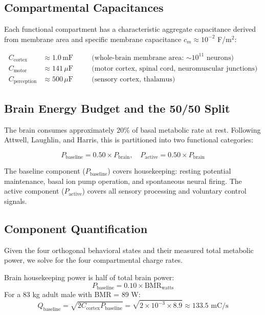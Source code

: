 \subsection{Compartmental Capacitances}

Each functional compartment has a characteristic aggregate capacitance derived from membrane area and specific membrane capacitance $c_m \approx 10^{-2}$ F/m$^2$:

\begin{align}
C_{\text{cortex}} &\approx 1.0 \, \text{mF} \quad &&\text{(whole-brain membrane area: $\sim 10^{11}$ neurons)} \\
C_{\text{motor}} &\approx 141 \, \mu\text{F} \quad &&\text{(motor cortex, spinal cord, neuromuscular junctions)} \\
C_{\text{perception}} &\approx 500 \, \mu\text{F} \quad &&\text{(sensory cortex, thalamus)}
\end{align}

\subsection{Brain Energy Budget and the 50/50 Split}

The brain consumes approximately 20\% of basal metabolic rate at rest. Following Attwell, Laughlin, and Harris, this is partitioned into two functional categories:

\begin{equation}
P_{\text{baseline}} = 0.50 \times P_{\text{brain}}, \quad P_{\text{active}} = 0.50 \times P_{\text{brain}}
\end{equation}

The baseline component ($P_{\text{baseline}}$) covers housekeeping: resting potential maintenance, basal ion pump operation, and spontaneous neural firing. The active component ($P_{\text{active}}$) covers all sensory processing and voluntary control signals.

\subsection{Component Quantification}

Given the four orthogonal behavioral states and their measured total metabolic power, we solve for the four compartmental charge rates.

\begin{definition}
Brain housekeeping power is half of total brain power:
\begin{equation}
P_{\text{baseline}} = 0.10 \times \text{BMR}_{\text{watts}}
\end{equation}
For a 83 kg adult male with BMR = 89 W:
\begin{equation}
Q_{\text{baseline}} = \sqrt{2 C_{\text{cortex}} P_{\text{baseline}}} = \sqrt{2 \times 10^{-3} \times 8.9} \approx 133.5 \text{ mC/s}
\end{equation}
\end{definition}

